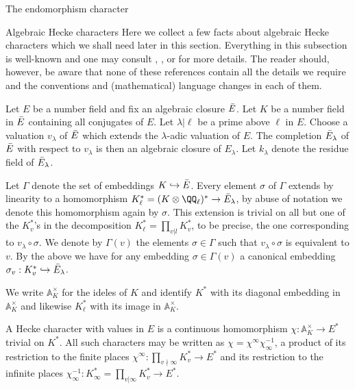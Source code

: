 \documentclass[11pt,a4paper]{article}
\begin{document}
\begin{section}{The endomorphism character}
\label{section_endo_char}
\begin{subsection}{Algebraic Hecke characters}
\label{subsection_Alg_Heck_chars}
Here we collect a few facts about algebraic Hecke characters which we shall need later in this section. 
Everything in this subsection is well-known and one may consult \cite{Periods_of_Hecke_characters}, \cite{Chai_Conrad_Oort}, or \cite{Serre72} for more details.
The reader should, however, be aware that none of these references contain all the details we require and the conventions and (mathematical) language changes in each of them. 


Let $E$ be a number field and fix an algebraic closure $\Bar{E}$. Let $K$ be a number field in $\Bar{E}$ containing all conjugates of $E$. Let $\lambda |\ell$ be a prime above $\ell$ in $E$.
 Choose a valuation $v_\lambda$ of $\Bar{E}$ which extends the $\lambda$-adic valuation of $E$. 
 The completion $\Bar{E}_\lambda$ of $\Bar{E}$ with respect to $v_\lambda$ is then an algebraic closure of $E_\lambda$.
 Let $k_\lambda$ denote the residue field of $\Bar{E}_\lambda$.

Let $\Gamma$ denote the set of embeddings  $K \hookrightarrow \Bar{E}$. Every element $\sigma$ of $\Gamma$ extends by linearity to a homomorphism $K_\ell^* = (K\otimes \QQ_\ell)^* \rightarrow \Bar{E}_\lambda$, by abuse of notation we denote this homomorphism again by $\sigma$. This extension is trivial on all but one of the $K_v^*$'s in the decomposition $K_\ell^* = \prod_{v|l} K_v^*$, to be precise, the one corresponding to $v_\lambda \circ \sigma$. We denote by $\Gamma(v)$ the elements $\sigma \in \Gamma$ such that $v_\lambda \circ \sigma$ is equivalent to $v$. By the above we have for any embedding $\sigma \in \Gamma(v)$ a canonical embedding $\sigma_v:K^*_v \hookrightarrow \Bar{E}_\lambda$.

We write $\mathbb{A}_K^\times$ for the ideles of $K$ and identify $K^*$ with its diagonal embedding in $\mathbb{A}_K^\times$ and likewise $K_\ell^*$ with its image in $\mathbb{A}_K^\times$.


A Hecke character with values in $E$ is a continuous homomorphism $\chi: \mathbb{A}_K^\times \rightarrow E^*$ trivial on $K^*$. All such characters may be written as $\chi = \chi^\infty\chi_\infty^{-1}$, a product of its restriction to the finite places $\chi^\infty:  \prod_{v\nmid \infty} K^*_v \rightarrow E^*$ and its restriction to the infinite places $\chi_\infty^{-1}: K^*_\infty = \prod_{v| \infty} K^*_v \rightarrow E^*$.


\end{subsection}
\end{section}
\end{document}
